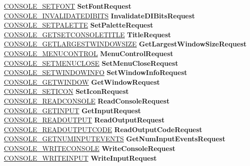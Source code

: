 \begin{DoxyCompactItemize}
\begin{tabbing}
\>\hyperlink{struct___c_o_n_s_o_l_e___s_e_t_f_o_n_t}{CONSOLE\_SETFONT} {\bfseries SetFontRequest}\\
\>\hyperlink{struct___c_o_n_s_o_l_e___i_n_v_a_l_i_d_a_t_e_d_i_b_i_t_s}{CONSOLE\_INVALIDATEDIBITS} {\bfseries InvalidateDIBitsRequest}\\
\>\hyperlink{struct___c_o_n_s_o_l_e___s_e_t_p_a_l_e_t_t_e}{CONSOLE\_SETPALETTE} {\bfseries SetPaletteRequest}\\
\>\hyperlink{struct___c_o_n_s_o_l_e___g_e_t_s_e_t_c_o_n_s_o_l_e_t_i_t_l_e}{CONSOLE\_GETSETCONSOLETITLE} {\bfseries TitleRequest}\\
\>\hyperlink{struct___c_o_n_s_o_l_e___g_e_t_l_a_r_g_e_s_t_w_i_n_d_o_w_s_i_z_e}{CONSOLE\_GETLARGESTWINDOWSIZE} {\bfseries GetLargestWindowSizeRequest}\\
\>\hyperlink{struct___c_o_n_s_o_l_e___m_e_n_u_c_o_n_t_r_o_l}{CONSOLE\_MENUCONTROL} {\bfseries MenuControlRequest}\\
\>\hyperlink{struct___c_o_n_s_o_l_e___s_e_t_m_e_n_u_c_l_o_s_e}{CONSOLE\_SETMENUCLOSE} {\bfseries SetMenuCloseRequest}\\
\>\hyperlink{struct___c_o_n_s_o_l_e___s_e_t_w_i_n_d_o_w_i_n_f_o}{CONSOLE\_SETWINDOWINFO} {\bfseries SetWindowInfoRequest}\\
\>\hyperlink{struct___c_o_n_s_o_l_e___g_e_t_w_i_n_d_o_w}{CONSOLE\_GETWINDOW} {\bfseries GetWindowRequest}\\
\>\hyperlink{struct___c_o_n_s_o_l_e___s_e_t_i_c_o_n}{CONSOLE\_SETICON} {\bfseries SetIconRequest}\\
\>\hyperlink{struct___c_o_n_s_o_l_e___r_e_a_d_c_o_n_s_o_l_e}{CONSOLE\_READCONSOLE} {\bfseries ReadConsoleRequest}\\
\>\hyperlink{struct___c_o_n_s_o_l_e___g_e_t_i_n_p_u_t}{CONSOLE\_GETINPUT} {\bfseries GetInputRequest}\\
\>\hyperlink{struct___c_o_n_s_o_l_e___r_e_a_d_o_u_t_p_u_t}{CONSOLE\_READOUTPUT} {\bfseries ReadOutputRequest}\\
\>\hyperlink{struct___c_o_n_s_o_l_e___o_u_t_p_u_t_c_o_d_e}{CONSOLE\_READOUTPUTCODE} {\bfseries ReadOutputCodeRequest}\\
\>\hyperlink{struct___c_o_n_s_o_l_e___g_e_t_n_u_m_i_n_p_u_t_e_v_e_n_t_s}{CONSOLE\_GETNUMINPUTEVENTS} {\bfseries GetNumInputEventsRequest}\\
\>\hyperlink{struct___c_o_n_s_o_l_e___w_r_i_t_e_c_o_n_s_o_l_e}{CONSOLE\_WRITECONSOLE} {\bfseries WriteConsoleRequest}\\
\>\hyperlink{struct___c_o_n_s_o_l_e___w_r_i_t_e_i_n_p_u_t}{CONSOLE\_WRITEINPUT} {\bfseries WriteInputRequest}\\

\end{tabbing}
\end{DoxyCompactItemize}
